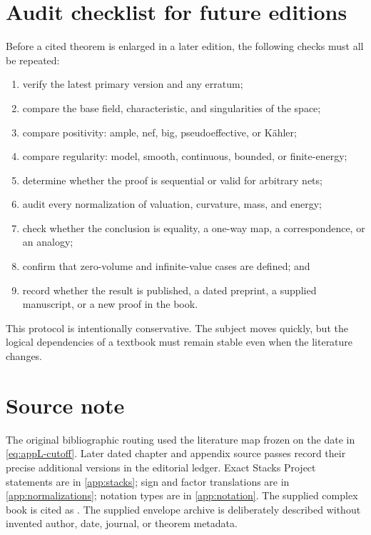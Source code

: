 \section{Audit checklist for future editions}
\label{sec:appL-future}

Before a cited theorem is enlarged in a later edition, the following checks
must all be repeated:

\begin{enumerate}
\item verify the latest primary version and any erratum;
\item compare the base field, characteristic, and singularities of the
  space;
\item compare positivity: ample, nef, big, pseudoeffective, or Kähler;
\item compare regularity: model, smooth, continuous, bounded, or
  finite-energy;
\item determine whether the proof is sequential or valid for arbitrary nets;
\item audit every normalization of valuation, curvature, mass, and energy;
\item check whether the conclusion is equality, a one-way map, a
  correspondence, or an analogy;
\item confirm that zero-volume and infinite-value cases are defined; and
\item record whether the result is published, a dated preprint, a supplied
  manuscript, or a new proof in the book.
\end{enumerate}

This protocol is intentionally conservative.  The subject moves quickly,
but the logical dependencies of a textbook must remain stable even when the
literature changes.

\section*{Source note}
\label{sec:appL-sources}

The original bibliographic routing used the literature map frozen on the
date in \eqref{eq:appL-cutoff}. Later dated chapter and appendix source
passes record their precise additional versions in the editorial ledger.  Exact
Stacks Project statements are in \cref{app:stacks}; sign and factor
translations are in \cref{app:normalizations}; notation types are in
\cref{app:notation}.  The supplied complex book is cited as
\cite{XiaBook}.  The supplied envelope archive is deliberately described
without invented author, date, journal, or theorem metadata.


